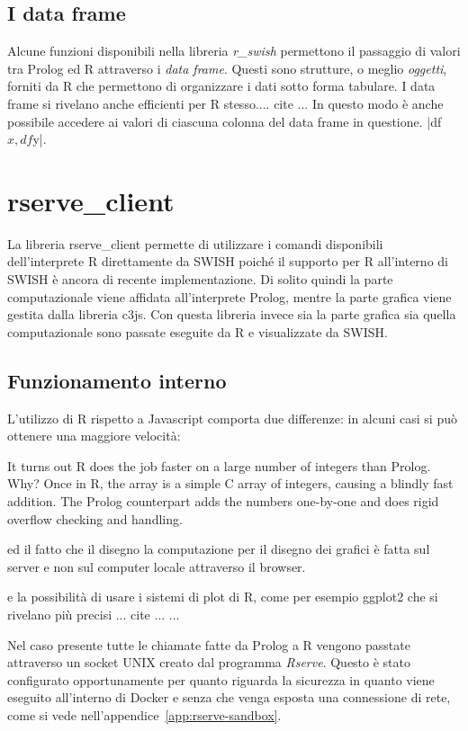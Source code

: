 \documentclass[10pt,titlepage,twoside,a4paper]{report}
\begin{document}
        \subsection{I data frame}
Alcune funzioni disponibili nella libreria \emph{r\_swish} permettono il 
passaggio di valori tra Prolog ed R attraverso i \emph{data frame}. Questi sono 
strutture, o meglio \emph{oggetti}, forniti da R che permettono di organizzare 
i dati sotto forma tabulare. I data frame si rivelano anche efficienti per R 
stesso.... cite ... In questo modo è anche possibile accedere ai valori di 
ciascuna colonna del data frame in questione.
|df$x,df$y|.


    \section{rserve\_client}
La libreria rserve\_client permette di utilizzare i comandi 
disponibili dell'interprete R direttamente da SWISH poiché il supporto per R 
all'interno di SWISH è ancora di recente implementazione. 
Di solito quindi la parte computazionale viene affidata all'interprete Prolog, 
mentre la parte grafica viene gestita dalla libreria c3js. Con questa libreria
invece sia la parte grafica sia quella computazionale sono passate eseguite
da R e visualizzate da SWISH.

        \subsection{Funzionamento interno}
L'utilizzo di R rispetto a Javascript comporta due 
differenze: in alcuni casi si può ottenere una maggiore 
velocità\cite{rFaster}:
\begin{displayquote}
[..] It turns out R does the job faster on a large number of integers
than Prolog.  Why?  Once in R, the array is a simple C array of integers,
causing a blindly fast addition.  The Prolog counterpart adds the numbers
one-by-one and does rigid overflow checking and handling.
\end{displayquote}
 
ed il 
fatto che il disegno 
la computazione per il disegno dei grafici è fatta sul server e non sul 
computer locale attraverso il browser.
 
e la possibilità di usare i sistemi di plot di R, come per esempio ggplot2 
che si rivelano più precisi ... cite ... ...

Nel caso presente tutte le chiamate fatte da Prolog a R vengono passtate 
attraverso un socket UNIX creato dal programma \emph{Rserve}\cite{rserve}. 
Questo è stato configurato opportunamente per quanto riguarda la sicurezza 
in quanto viene eseguito all'interno di Docker e senza che venga esposta una 
connessione di rete, come si vede nell'appendice~\ref{app:rserve-sandbox}.
\end{document}
